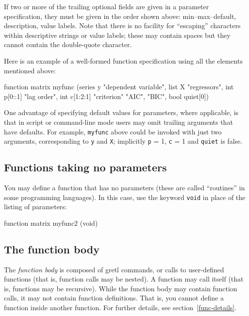 If two or more of the trailing optional fields are given in a
parameter specification, they must be given in the order shown above:
min--max--default, description, value labels. Note that there is no
facility for ``escaping'' characters within descriptive strings or
value labels; these may contain spaces but they cannot contain the
double-quote character.  

Here is an example of a well-formed function specification using all
the elements mentioned above:
%
\begin{code}
function matrix myfunc (series y "dependent variable",
                        list X "regressors",
                        int p[0::1] "lag order",
                        int c[1:2:1] "criterion" {"AIC", "BIC"},
                        bool quiet[0])
\end{code} 

One advantage of specifying default values for parameters, where
applicable, is that in script or command-line mode users may omit
trailing arguments that have defaults. For example, \texttt{myfunc}
above could be invoked with just two arguments, corresponding to
\texttt{y} and \texttt{X}; implicitly \texttt{p} = 1, \texttt{c} = 1
and \texttt{quiet} is false.

\subsection{Functions taking no parameters}

You may define a function that has no parameters (these are called
``routines'' in some programming languages).  In this case,  
use the keyword \texttt{void} in place of the listing of parameters:
%    
\begin{code}
function matrix myfunc2 (void)
\end{code}


\subsection{The function body}
   
The \textsl{function body} is composed of gretl commands, or
calls to user-defined functions (that is, function calls may be
nested).  A function may call itself (that is, functions may be
recursive). While the function body may contain function calls, it may
not contain function definitions.  That is, you cannot define a
function inside another function.  For further details, see
section~\ref{func-details}.


